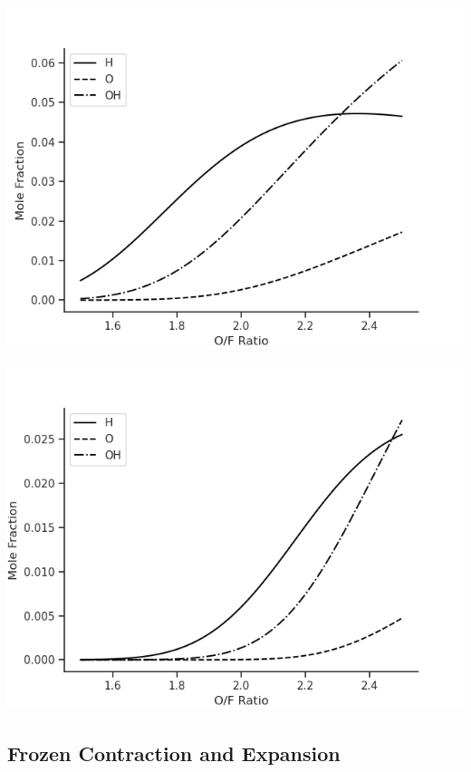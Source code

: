 \documentclass[11pt]{article}
\begin{document}
\begin{minipage}{.5\linewidth}
  \centering
  \includegraphics[width=\linewidth]{dissociated-chamber.png}
\end{minipage}%
\begin{minipage}{.5\linewidth}
  \centering
  \includegraphics[width=\linewidth]{dissociated-nozzle.png}
\end{minipage}


\subsection{Frozen Contraction and Expansion}
\end{document}
